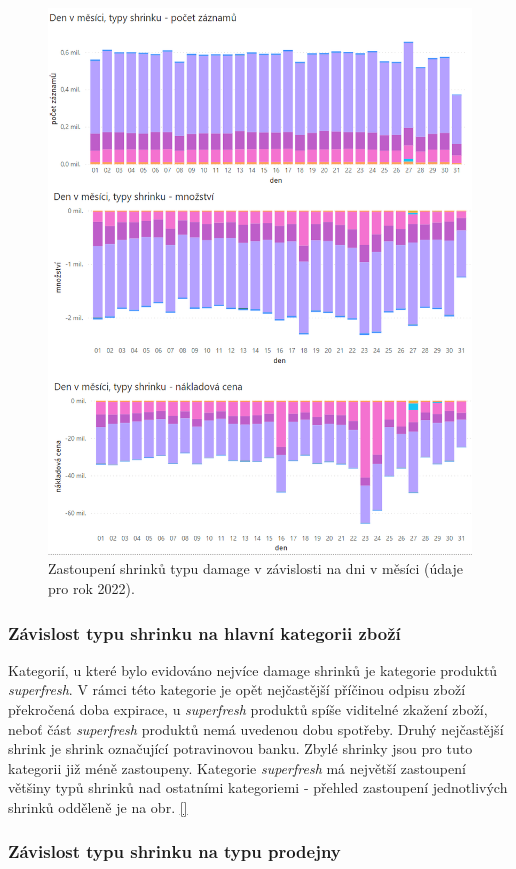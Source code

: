 \begin{figure}[hbtp!]
    \centering
    \includegraphics[width=\textwidth]{obrazky/grafy/Grad_dny_mesic-D.png}
    \caption{Zastoupení shrinků typu damage v závislosti na dni v měsíci (údaje pro rok 2022).}
    \label{obr:rok:g:mesicD}
\end{figure}

\subsubsection*{Závislost typu shrinku na hlavní kategorii zboží}

Kategorií, u které bylo evidováno nejvíce damage shrinků je kategorie produktů \emph{superfresh}. V rámci této kategorie je opět nejčastější příčinou odpisu zboží překročená doba expirace, u \emph{superfresh} produktů spíše viditelné zkažení zboží, neboť část \emph{superfresh} produktů nemá uvedenou dobu spotřeby. Druhý nejčastější shrink je shrink označující potravinovou banku. Zbylé shrinky jsou pro tuto kategorii již méně zastoupeny. Kategorie \emph{superfresh} má největší zastoupení většiny typů shrinků nad ostatními kategoriemi - přehled zastoupení jednotlivých shrinků odděleně je na obr. \ref{} %


\subsubsection*{Závislost typu shrinku na typu prodejny}


